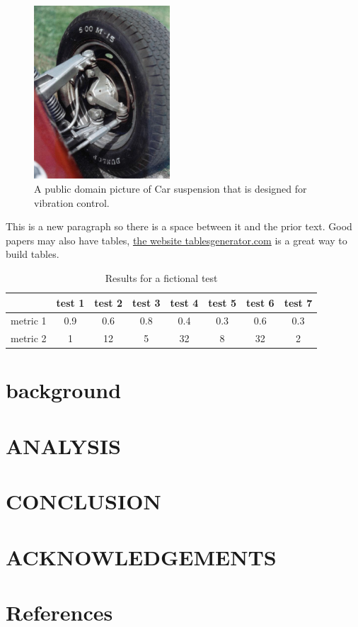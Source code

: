 \documentclass[10pt,letterpaper]{article}
\begin{document}
\begin{figure}
	\centering
	\includegraphics[width=2in]{figures/suspension.jpg}
	\caption{A public domain picture of Car suspension that is designed for vibration control.}
	\label{fig:suspension}
\end{figure}

This is a new paragraph so there is a space between it and the prior text. Good papers may also have tables, \href{https://www.tablesgenerator.com/}{the website tablesgenerator.com} is a great way to build tables.  
\begin{table}[]
	\centering
	\caption{Results for a fictional test}
	\label{table:test}
	\begin{tabular}{@{}lccccccc@{}}
		\toprule
		 & test 1 & test 2 & test 3 & test 4 & test 5 & test 6 & test 7 \\ \midrule
		metric 1 & 0.9 & 0.6 & 0.8 & 0.4 & 0.3 & 0.6 & 0.3 \\
		metric 2 & 1 & 12 & 5 & 32 & 8 & 32 & 2 \\ \bottomrule
	\end{tabular}
\end{table}


\blindtext


\section{background}
\blindtext

\section{ANALYSIS}
\blindtext

\section{CONCLUSION}
\blindtext

\section{ACKNOWLEDGEMENTS}
\blindtext

\section{References}
\vspace{-1.5ex}

\renewcommand{\refname}{}

\end{document}
